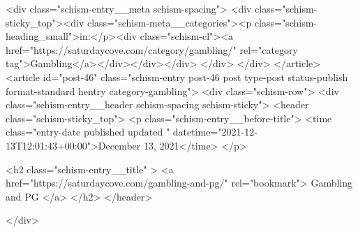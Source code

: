 {		<div class="schism-entry__meta schism-spacing">			<div class="schism-sticky_top"><div class="schism-meta__categories"><p class="schism-heading_small">in:</p><div class="schism-cl"><a href="https://saturdaycove.com/category/gambling/" rel="category tag">Gambling</a></div></div></div>		</div>
	</div>
</article>
<article id="post-46" class="schism-entry post-46 post type-post status-publish format-standard hentry category-gambling">
	<div class="schism-row">		<div class="schism-entry__header schism-spacing schism-sticky">			<header class="schism-sticky_top">				<p class="schism-entry__before-title">
					<time class="entry-date published updated " datetime="2021-12-13T12:01:43+00:00">December 13, 2021</time>				</p>

				<h2 class="schism-entry__title" >
					<a href="https://saturdaycove.com/gambling-and-pg/" rel="bookmark">
						Gambling and PG					</a>
				</h2>
			</header>

					</div>

}
